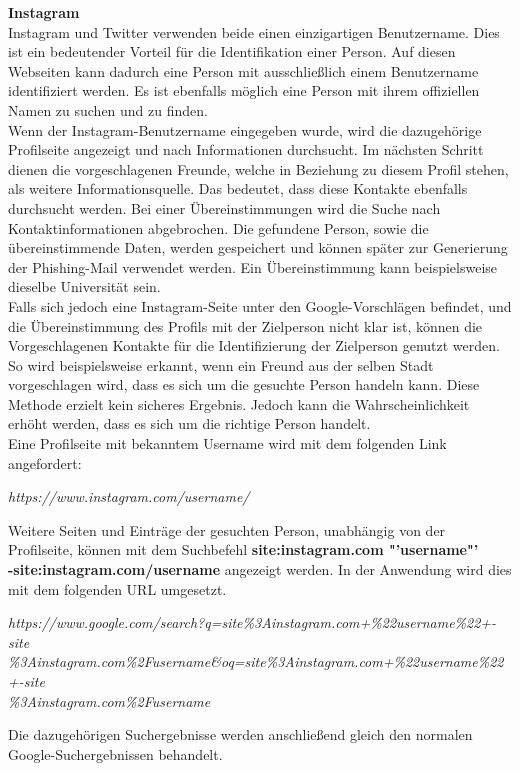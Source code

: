 			\textbf{Instagram}\\
			Instagram und Twitter verwenden beide einen einzigartigen Benutzername. Dies ist ein bedeutender Vorteil für die Identifikation einer Person. Auf diesen Webseiten kann dadurch eine Person mit ausschließlich einem Benutzername identifiziert werden. Es ist ebenfalls möglich eine Person mit ihrem offiziellen Namen zu suchen und zu finden.\\
			Wenn der Instagram-Benutzername eingegeben wurde, wird die dazugehörige Profilseite angezeigt und nach Informationen durchsucht. Im nächsten Schritt dienen die vorgeschlagenen Freunde, welche in Beziehung zu diesem Profil stehen, als weitere Informationsquelle. Das bedeutet, dass diese Kontakte ebenfalls durchsucht werden. Bei einer Übereinstimmungen wird die Suche nach Kontaktinformationen abgebrochen. Die gefundene Person, sowie die übereinstimmende Daten, werden gespeichert und können später zur Generierung  der Phishing-Mail verwendet werden. Ein Übereinstimmung kann beispielsweise dieselbe Universität sein.\\
			Falls sich jedoch eine Instagram-Seite unter den Google-Vorschlägen befindet, und die Übereinstimmung des Profils mit der Zielperson nicht klar ist, können die Vorgeschlagenen Kontakte für die Identifizierung der Zielperson genutzt werden. So wird beispielsweise erkannt, wenn ein Freund aus der selben Stadt vorgeschlagen wird, dass es sich um die gesuchte Person handeln kann. Diese Methode erzielt kein sicheres Ergebnis. Jedoch kann die Wahrscheinlichkeit erhöht werden, dass es sich um die richtige Person handelt.\\
			Eine Profilseite mit bekanntem Username  wird mit dem folgenden Link angefordert:
			
			\textit{https://www.instagram.com/username/}
			
			Weitere Seiten und Einträge der gesuchten Person, unabhängig von der Profilseite, können mit dem Suchbefehl \textbf{site:instagram.com "'username"' \\ -site:instagram.com/username} angezeigt werden. \cite{Bazzell} In der Anwendung wird dies mit dem folgenden URL umgesetzt.
					
			\textit{https://www.google.com/search?q=site\%3Ainstagram.com+\%22username\%22+-site\\
				\%3Ainstagram.com\%2Fusername\&oq=site\%3Ainstagram.com+\%22username\%22+-site\\
				\%3Ainstagram.com\%2Fusername}
			
			Die dazugehörigen Suchergebnisse werden anschließend gleich den normalen Google-Suchergebnissen behandelt.
			
